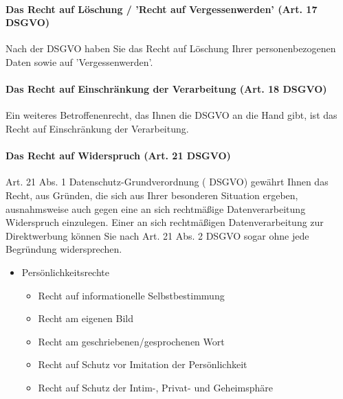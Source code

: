 \paragraph{Das Recht auf Löschung / 'Recht auf Vergessenwerden' (Art. 17 DSGVO)} Nach der DSGVO haben Sie das Recht auf Löschung Ihrer personenbezogenen Daten sowie auf 'Vergessenwerden'.

\paragraph{Das Recht auf Einschränkung der Verarbeitung (Art. 18 DSGVO)} Ein weiteres Betroffenenrecht, das Ihnen die DSGVO an die Hand gibt, ist das Recht auf Einschränkung der Verarbeitung.

\paragraph{Das Recht auf Widerspruch (Art. 21 DSGVO)} Art. 21 Abs. 1 Datenschutz-Grundverordnung ( DSGVO) gewährt Ihnen das Recht, aus Gründen, die sich aus Ihrer besonderen Situation ergeben, ausnahmsweise auch gegen eine an sich rechtmäßige Datenverarbeitung Widerspruch einzulegen. Einer an sich rechtmäßigen Datenverarbeitung zur Direktwerbung können Sie nach Art. 21 Abs. 2 DSGVO sogar ohne jede Begründung widersprechen.

\begin{itemize}
	\item Persönlichkeitsrechte
	\begin{itemize}
		\item Recht auf informationelle Selbstbestimmung
		\item Recht am eigenen Bild
		\item Recht am geschriebenen/gesprochenen Wort
		\item Recht auf Schutz vor Imitation der Persönlichkeit
		\item Recht auf Schutz der Intim-, Privat- und Geheimsphäre
	\end{itemize}
\end{itemize}